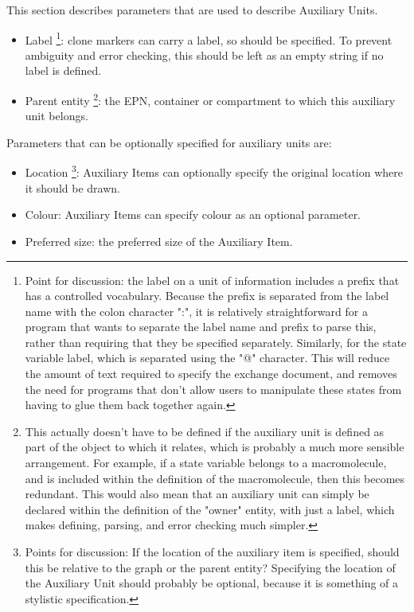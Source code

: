 \documentclass[11pt]{article}
\begin{document}
This section describes parameters that are used to describe Auxiliary Units.

\begin{itemize}
\item Label \footnote{Point for discussion: the label on a unit of information includes a prefix that has a controlled vocabulary.  Because the prefix is separated from the label name with the colon character ":", it is relatively straightforward for a program that wants to separate the label name and prefix to parse this, rather than requiring that they be specified separately.   Similarly, for the state variable label, which is separated using the "@" character.  This will reduce the amount of text required to specify the exchange document, and removes the need for programs that don't allow users to manipulate these states from having to glue them back together again.
}: clone markers can carry a label, so should be specified.  To prevent ambiguity and error checking, this should be left as an empty string if no label is defined.
\item Parent entity \footnote{This actually doesn't have to be defined if the auxiliary unit is defined as part of the object to which it relates, which is probably a much more sensible arrangement.  For example, if a state variable belongs to a macromolecule, and is included within the definition of the macromolecule, then this becomes redundant.  This would also mean that an auxiliary unit can simply be declared within the definition of the "owner" entity, with just a label, which makes defining, parsing, and error checking much simpler.}: the EPN, container or compartment to which this auxiliary unit belongs.
\end{itemize}

Parameters that can be optionally specified for auxiliary units are:

\begin{itemize}
\item Location \footnote{Points for discussion: If the location of the auxiliary item is specified, should this be relative to the graph or the parent entity?  Specifying the location of the Auxiliary Unit should probably be optional, because it is something of a stylistic specification.  
}: Auxiliary Items can optionally specify the original location where it should be drawn.
\item Colour: Auxiliary Items can specify colour as an optional parameter.
\item Preferred size: the preferred size of the Auxiliary Item.
\end{itemize}
\end{document}
